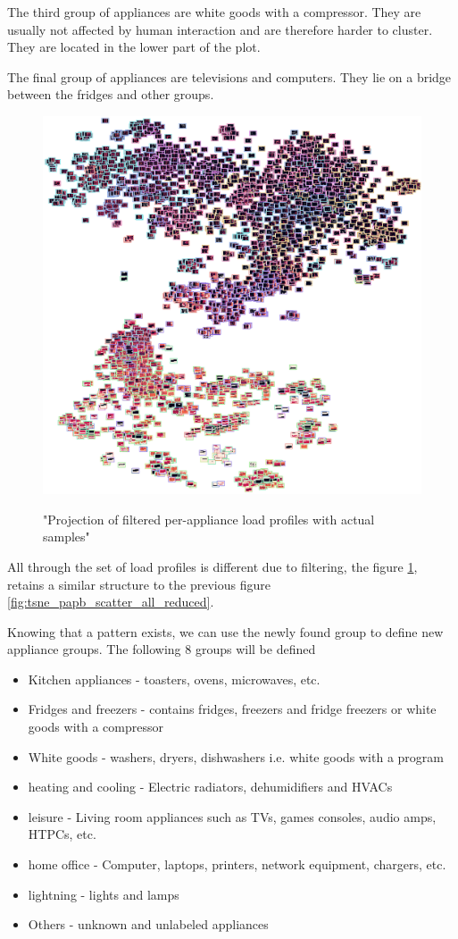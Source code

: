 The third group of appliances are white goods with a compressor.
They are usually not affected by human interaction and are therefore harder to cluster.
They are located in the lower part of the plot.

The final group of appliances are televisions and computers. They lie 
on a bridge between the fridges and other groups. 

\begin{figure}[H]
	\centering
	\caption{"Projection of filtered per-appliance load profiles with actual samples"}
	\includegraphics[width=.9\textwidth]{Figures/TSNE/TSNE_results/all/img_scatter_allall_reduced_max.png}
	\label{fig:tsne_papb_img_scatter_all_reduced}
\end{figure}

All through the set of load profiles is different due to filtering,
the figure \ref{fig:tsne_papb_img_scatter_all_reduced},
retains a similar structure to the previous figure \ref{fig:tsne_papb_scatter_all_reduced}. 

Knowing that a pattern exists, we can use the newly found group to define new appliance groups.
The following 8 groups will be defined
\begin{itemize}
    \item Kitchen appliances - toasters, ovens, microwaves, etc.
    \item Fridges and freezers  - contains fridges, freezers and fridge freezers or white goods with a compressor
    \item White goods - washers, dryers, dishwashers i.e. white goods with a program
    \item heating and cooling - Electric radiators, dehumidifiers and HVACs
    \item leisure -  Living room appliances such as TVs, games consoles, audio amps, HTPCs, etc.
    \item home office - Computer, laptops, printers, network equipment, chargers, etc.
    \item lightning - lights and lamps
    \item Others - unknown and unlabeled appliances
\end{itemize}

